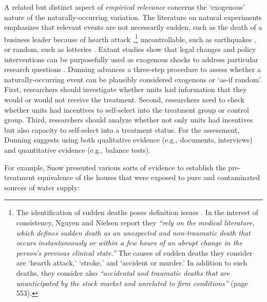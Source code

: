 \documentclass[11pt]{article}
\begin{document}
\begin{refsection}
A related but distinct aspect of \textit{empirical relevance} concerns the
`exogenous' nature of the naturally-occurring variation. The literature on
natural experiments emphasizes that relevant events are not necessarily sudden,
such as the death of a business leader because of hearth attack
\autocite[e.g.,][]{nguyen_et_al_2010},\footnote{The identification of sudden
deaths poses definition issues
\autocite[e.g.,][]{azoulay_et_al_2010,oettl_2012}.  In the interest of
consistency, Nguyen and Nielsen \autocite*{nguyen_et_al_2010} report they
\textit{``rely on the medical literature, which defines sudden death as an
unexpected and non-traumatic death that occurs instantaneously or within a few
hours of an abrupt change in the person’s previous clinical state.''} The causes
of sudden deaths they consider are `hearth attack,' `stroke,' and `accident or
murder.' In addition to such deaths, they consider also \textit{``accidental 
and traumatic deaths that are unanticipated by the stock market and unrelated to
firm conditions''} (page 553). } uncontrollable, such as earthquakes
\autocite[e.g.,][]{belloc_et_al_2016}, or random, such as lotteries
\autocite[e.g.,][]{poulos_2019}.  Extant studies show that legal
changes and policy interventions can be purposefully used as exogenous shocks to
address particular research questions \autocites[e.g.,][]{beaman_et_al_2012,
matsa_miller_2013,chauchard_2014}. Dunning \autocite*[][page 236]{dunning_2012}
advances a three-step procedure to assess whether a naturally-occurring event
can be plausibly considered exogenous or `as-if random'. First, researchers
should investigate whether units had information that they would or would not
receive the treatment. Second, researchers need to check whether units had
incentives to self-select into the treatment group or control group. Third,
researchers should analyze whether not only units had incentives but also
capacity to self-select into a treatment status. For the assessment, Dunning
\autocite*{dunning_2012} suggests using both qualitative evidence (e.g.,
documents, interviews) and quantitative evidence (e.g., balance tests).

For example, Snow \autocite*{snow_1855} presented various sorts of evidence to
establish the pre-treatment equivalence of the houses that were exposed to pure
and contaminated sources of water supply:


\end{refsection}
\end{document}
